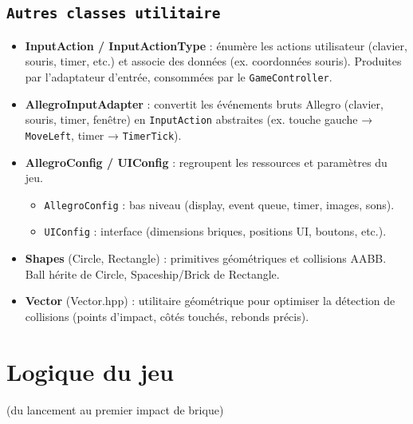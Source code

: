 \documentclass[12pt]{article}
\begin{document}
\subsection{\texttt{Autres classes utilitaire }}
\begin{itemize}
    \item  \textbf{InputAction / InputActionType} : énumère les actions utilisateur (clavier, souris, timer, etc.) et associe des données (ex. coordonnées souris). Produites par l’adaptateur d’entrée, consommées par le \colorbox{gray!20}{\texttt{GameController}}.

    \item \textbf{AllegroInputAdapter} : convertit les événements bruts Allegro (clavier, souris, timer, fenêtre) en \colorbox{gray!20}{\texttt{InputAction}} abstraites (ex. touche gauche → \colorbox{gray!20}{\texttt{MoveLeft}}, timer → \colorbox{gray!20}{\texttt{TimerTick}}).

    \item \textbf{AllegroConfig / UIConfig} : regroupent les ressources et paramètres du jeu.
            \begin{itemize}
                    \item  \colorbox{gray!20}{\texttt{AllegroConfig}} : bas niveau (display, event queue, timer, images, sons).
                    \item  \colorbox{gray!20}{\texttt{UIConfig}} : interface (dimensions briques, positions UI, boutons, etc.).
            \end{itemize}
    \item \textbf{Shapes} (Circle, Rectangle) : primitives géométriques et collisions AABB. Ball hérite de Circle, Spaceship/Brick de Rectangle.

    \item \textbf{Vector} (Vector.hpp) : utilitaire géométrique pour optimiser la détection de collisions (points d’impact, côtés touchés, rebonds précis).
    
\end{itemize}




\newpage
\section{Logique du jeu } (du lancement au premier impact de brique)
\end{document}
